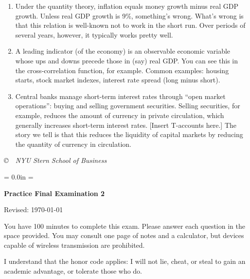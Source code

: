 \documentclass[letterpaper,12pt]{article}
\def\HeadName{Practice Final Examination 1}
\begin{document}
\begin{enumerate}
\begin{enumerate}
\item 
Under the quantity theory, inflation equals money growth
minus real GDP growth. Unless real GDP growth is 9\%, something's
wrong. What's wrong is that this relation is well-known not to work
in the short run.  Over periods of several years, however, it
typically works pretty well.

\item 
A leading indicator (of the economy)
is an observable economic variable whose ups and
downs precede those in (say) real GDP.
You can see this in the cross-correlation function, for example.
Common examples:  housing starts, stock market indexes,
interest rate spread (long minus short).

\item 
Central banks manage short-term interest rates through
``open market operations'': buying and selling government
securities. Selling securities, for example, reduces the amount of
currency in private circulation, which generally increases
short-term interest rates.  [Insert T-accounts here.] The story we
tell is that this reduces the liquidity of capital markets by
reducing the quantity of currency in circulation.

\end{enumerate}

\end{enumerate}




\vfill \centerline{\it \copyright \ \number\year \
NYU Stern School of Business}



\newpage
\def\HeadName{Practice Final Examination 2}
\parindent = 0.0in
\parskip = \bigskipamount
\setcounter{page}{1} \thispagestyle{empty}
\Head

\centerline{\large \bf \HeadName}%
\centerline{Revised:  \today}

\bigskip
You have 100 minutes to complete this exam.  Please answer each
question in the space provided. You may consult one page of notes
and a calculator, but devices capable of wireless transmission are
prohibited.

I understand that the honor code applies: I will not lie, cheat, 
or steal to gain an academic advantage, or tolerate those who do.
\end{document}
